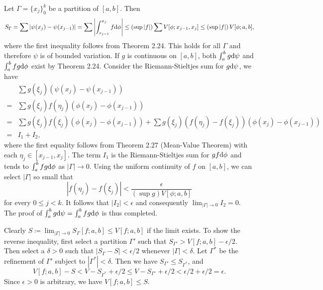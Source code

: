 \begin{exercise}{2.15}
  Let $\Gamma = \{x_j\}_0^k$ be a partition of $[a,b]$.
  Then
  \[
    S_\Gamma = \sum \left\vert \psi(x_j) - \psi(x_{j-1}) \right\vert
    = \sum \left\vert \int_{x_{j-1}}^{x_j} f \mathrm{d} \phi \right\vert
    \le \left(\sup |f|\right) \sum V[\phi; x_{j-1}, x_j]
    \le \left(\sup |f|\right) V[\phi; a,b],
  \]
  where the first inequality follows from Theorem 2.24.
  This holds for all $\Gamma$ and therefore $\psi$ is of bounded variation.
  If $g$ is continuous on $[a,b]$,
  both $\int_a^b g \mathrm{d} \psi$ and $\int_a^b fg \mathrm{d} \phi$ exist
  by Theorem 2.24.
  Consider the Riemann-Stieltjes sum for $g \mathrm{d} \psi$, we have
  \begin{align*}
    & \sum g(\xi_j) \left( \psi(x_j) - \psi(x_{j-1}) \right) \\
    = & \sum g(\xi_j) f(\eta_j) \left( \phi(x_j) - \phi(x_{j-1}) \right) \\
    = & \sum g(\xi_j) f(\xi_j) \left( \phi(x_j) - \phi(x_{j-1}) \right)
    + \sum g(\xi_j) \left( f(\eta_j) - f(\xi_j) \right)
    \left( \phi(x_j) - \phi(x_{j-1}) \right) \\
    = & I_1 + I_2,
  \end{align*}
  where the first equality follows from Theorem 2.27 (Mean-Value Theorem)
  with each $\eta_j \in [x_{j-1}, x_j]$.
  The term $I_1$ is the Riemann-Stieltjes sum for $gf \mathrm{d} \phi$
  and tends to $\int_a^b fg \mathrm{d} \phi$ as $|\Gamma| \rightarrow 0$.
  Using the uniform continuity of $f$ on $[a,b]$,
  we can select $|\Gamma|$ so small that
  \[
    \left\vert f(\eta_j) - f(\xi_j) \right\vert <
    \frac{\epsilon} {\left( \sup g \right) V[\phi; a,b]}
  \]
  for every $0 \le j < k$.
  It follows that $|I_2| < \epsilon$
  and consequently $\lim_{|\Gamma| \rightarrow 0} I_2 = 0$.
  The proof of $\int_a^b g \mathrm{d} \psi = \int_a^b fg \mathrm{d} \phi$ is thus completed.
\end{exercise}

\begin{exercise}{2.20}
  Clearly $S \coloneqq \lim_{|\Gamma| \rightarrow 0} S_\Gamma[f;a,b] \le V[f;a,b]$
  if the limit exists.
  To show the reverse inequality,
  first select a partition $\Gamma'$ such that
  $S_{\Gamma'} > V[f;a,b] - \epsilon/2$.
  Then select a $\delta > 0$ such that
  $|S_\Gamma - S| < \epsilon/2$ whenever $|\Gamma| < \delta$.
  Let $\Gamma^\ast$ be the refinement of $\Gamma'$
  subject to $|\Gamma^\ast| < \delta$.
  Then we have $S_{\Gamma'} \le S_{\Gamma^\ast}$, and
  \[
    V[f;a,b] - S < V - S_{\Gamma^\ast} + \epsilon/2
    \le V - S_{\Gamma'} + \epsilon/2
    < \epsilon/2 + \epsilon/2 = \epsilon.
  \]
  Since $\epsilon > 0$ is arbitrary,
  we have $V[f;a,b] \le S$.
\end{exercise}

